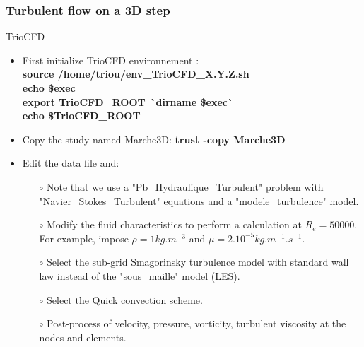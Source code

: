 \documentclass[10pt]{beamer}
\begin{document}
\begin{frame}
\frametitle{Turbulent flow on a 3D step}
\begin{block}{TrioCFD}

\begin{itemize}
\item First initialize TrioCFD environnement :\\
{\small{
\textbf{source /home/triou/env\_TrioCFD\_X.Y.Z.sh }\\
\textbf{echo \$exec} \\
\textbf{export TrioCFD\_ROOT=\`\,dirname \$exec\`} \\
\textbf{echo \$TrioCFD\_ROOT} \\
}}

\item Copy the study named Marche3D: 
\textbf{trust -copy Marche3D}

\item Edit the data file and: \\
    \begin{itemize}
    \item [$\circ$] Note that we use a "Pb\_Hydraulique\_Turbulent" problem with "Navier\_Stokes\_Turbulent" equations and a "modele\_turbulence" model.
    \item [$\circ$] Modify the fluid characteristics to perform a calculation at $R_e=50000$. For example, impose $\rho = 1 kg.m^{-3}$ and $\mu=2.10^{-5} kg.m^{-1}.s^{-1}$.
    \item [$\circ$] Select the sub-grid Smagorinsky turbulence model with standard wall law instead of the "sous\_maille" model (LES).
    \item [$\circ$] Select the Quick convection scheme.
    \item [$\circ$] Post-process of velocity, pressure, vorticity, turbulent viscosity at the nodes and elements.
    \end{itemize}

\end{itemize}

\end{block}
\end{frame}
\end{document}
